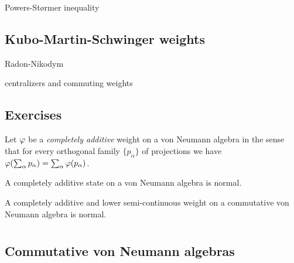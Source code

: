 \documentclass{../../large}
\begin{document}
\begin{prb}
\end{prb}

\begin{prb}
Powers-St\o rmer inequality
\end{prb}





\section{Kubo-Martin-Schwinger weights}
Radon-Nikodym

centralizers and commuting weights





\section*{Exercises}

\begin{prb}
Let $\varphi$ be a \emph{completely additive} weight on a von Neumann algebra in the sense that for every orthogonal family $\{p_\alpha\}$ of projections we have $\varphi(\sum_\alpha p_\alpha)=\sum_\alpha\varphi(p_\alpha)$.
\begin{parts}
\item A completely additive state on a von Neumann algebra is normal.
\item A completely additive and lower semi-continuous weight on a commutative von Neumann algebra is normal.
\end{parts}
\end{prb}















\chapter{}


\section{Commutative von Neumann algebras}
\end{document}
